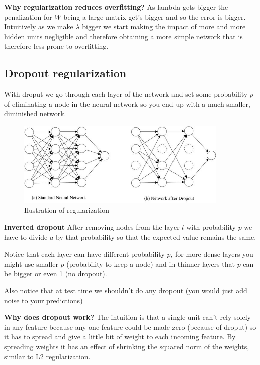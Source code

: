 \textbf{Why regularization reduces overfitting?} As lambda gets bigger the penalization 
for $W$ being a large matrix get's bigger and so
the error is bigger. Intuitively as we make $\lambda$ bigger we start making the 
impact of more and more hidden units negligible and therefore obtaining a more
simple network that is therefore less prone to overfitting.

\subsection*{Dropout regularization}
With droput we go through each layer of the network and set some probability $p$ 
of eliminating a node in the neural network so you end up with a much smaller, 
diminished network.
\begin{figure}[H]
    \begin{center}
            \includegraphics[width=0.9\textwidth]{img/regularization.jpg}
            \caption{Ilustration of regularization}
        \end{center}
\end{figure}

\textbf{Inverted dropout} After removing nodes from the layer $l$ with probability $p$ 
we have to divide $a$ by that probability so that the expected value remains the same.

Notice that each layer can have different probability $p$, for more dense layers you 
might use smaller $p$ (probability to keep a node) and in thinner layers that $p$ can
be bigger or even 1 (no dropout).

Also notice that at test time we shouldn't do any dropout (you would just add noise to your 
predictions)

\textbf{Why does dropout work?} The intuition is that a single unit can't rely solely
in any feature because any one feature could be made zero (because of droput) so 
it has to spread and give a little bit of weight to each incoming feature. By spreading
weights it has an effect of shrinking the squared norm of the weights, similar to L2
regularization.


